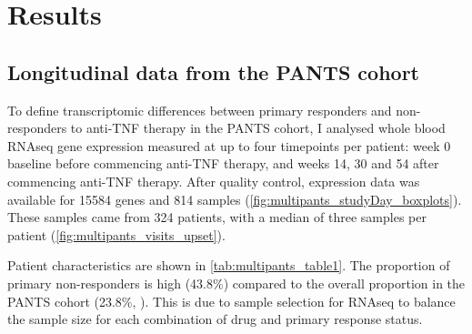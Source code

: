 
\section{Results}

\subsection{Longitudinal  data from the \gls{PANTS} cohort}

To define transcriptomic differences between primary responders and non-responders to anti-\gls{TNF} therapy in the \gls{PANTS} cohort, 
I analysed whole blood \gls{RNAseq} gene expression measured at up to four timepoints per patient:
week 0 baseline before commencing anti-\gls{TNF} therapy, and weeks 14, 30 and 54 after commencing anti-\gls{TNF} therapy.
After quality control, expression data was available for 15584 genes and 814 samples (\autoref{fig:multipants_studyDay_boxplots}).
These samples came from 324 patients, with a median of three samples per patient (\autoref{fig:multipants_visits_upset}).

Patient characteristics are shown in \autoref{tab:multipants_table1}.
The proportion of primary non-responders is high (43.8\%) compared to the overall proportion in the \gls{PANTS} cohort (23.8\%, \autocite{kennedy2019PredictorsAntiTNFTreatment}).
This is due to sample selection for \gls{RNAseq} to balance the sample size for each combination of drug and primary response status.

